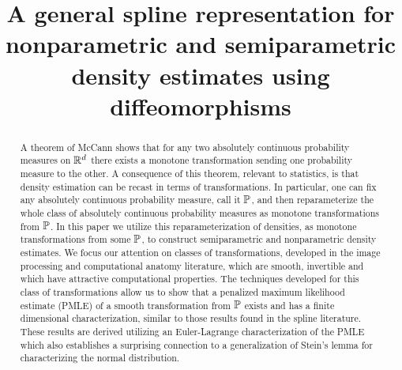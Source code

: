 \documentclass[noinfoline]{imsart}
\begin{document}



\begin{frontmatter}

\title{A general spline representation for nonparametric and semiparametric density estimates using diffeomorphisms}


\begin{abstract}
A theorem of McCann \cite{mcc:95} shows that for any two absolutely continuous probability measures on $\Bbb R^d$ there exists a monotone transformation sending one probability measure to the other.
A consequence of this theorem, relevant to statistics,  is that density estimation can be recast in terms of transformations. In particular, one can fix any absolutely continuous probability measure, call it $\Bbb P$, and then reparameterize the whole class of absolutely continuous probability measures as monotone transformations from $\Bbb P$.
In this paper we utilize this reparameterization of densities, as monotone transformations from some $\Bbb P$, to construct semiparametric and nonparametric density estimates. We focus our attention on classes of transformations, developed in the image processing and computational anatomy literature,  which are smooth,  invertible and which have attractive computational properties.
 The techniques developed for this class of transformations allow us to show that a penalized maximum likelihood estimate (PMLE) of a smooth transformation from $\Bbb P$ exists and has a finite dimensional characterization, similar to those results found in the spline literature.
 These results are derived utilizing  an Euler-Lagrange characterization of the PMLE which also establishes a surprising connection to a generalization of Stein's lemma for characterizing the normal distribution.
\end{abstract}

\begin{keyword}
\end{keyword}

\end{frontmatter}
\end{document}
